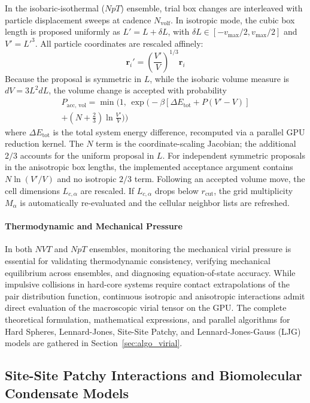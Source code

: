 \documentclass[final,5p,times,twocolumn]{elsarticle}
\begin{document}
In the isobaric-isothermal ($NpT$) ensemble, trial box changes are
interleaved with particle displacement sweeps at cadence
$N_{\text{volf}}$. In isotropic mode, the cubic box length is proposed
uniformly as $L'=L+\delta L$, with
$\delta L\in[-v_{\max}/2,v_{\max}/2]$ and $V'=L'^3$. All particle
coordinates are rescaled affinely:
\begin{equation}
    \mathbf{r}_i' = \left(\frac{V'}{V}\right)^{1/3} \mathbf{r}_i
\end{equation}
Because the proposal is symmetric in $L$, while the isobaric volume
measure is $dV=3L^2dL$, the volume change is accepted with probability
\begin{multline}
    P_{\text{acc, vol}} = \min\Big(1, \, \exp\Big(-\beta \left[\Delta E_{\text{tot}} + P(V' - V)\right] \\
    + \left(N + \frac{2}{3}\right)\ln\frac{V'}{V}\Big)\Big)
\end{multline}
where $\Delta E_{\text{tot}}$ is the total system energy difference,
recomputed via a parallel GPU reduction kernel. The $N$ term is the
coordinate-scaling Jacobian; the additional $2/3$ accounts for the
uniform proposal in $L$. For independent symmetric proposals in the
anisotropic box lengths, the implemented acceptance argument contains
$N\ln(V'/V)$ and no isotropic $2/3$ term. Following an accepted
volume move, the cell dimensions $L_{c,\alpha}$ are rescaled. If
$L_{c,\alpha}$ drops below $r_{\text{cut}}$, the grid multiplicity
$M_\alpha$ is automatically re-evaluated and the cellular neighbor
lists are refreshed. 

\paragraph{Thermodynamic and Mechanical Pressure}
In both $NVT$ and $NpT$ ensembles, monitoring the mechanical virial pressure is essential for validating thermodynamic consistency, verifying mechanical equilibrium across ensembles, and diagnosing equation-of-state accuracy. While impulsive collisions in hard-core systems require contact extrapolations of the pair distribution function, continuous isotropic and anisotropic interactions admit direct evaluation of the macroscopic virial tensor on the GPU. The complete theoretical formulation, mathematical expressions, and parallel algorithms for Hard Spheres, Lennard-Jones, Site-Site Patchy, and Lennard-Jones-Gauss (LJG) models are gathered in Section~\ref{sec:algo_virial}.

\subsection{Site-Site Patchy Interactions and Biomolecular Condensate Models}
\label{sec:algo_patchy_models}
\end{document}
